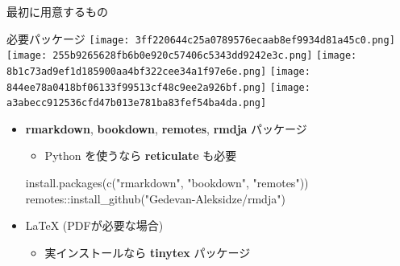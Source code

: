 \documentclass[
  ignorenonframetext,
]{beamer}
\newenvironment{Shaded}{\begin{snugshade}}{\end{snugshade}}
\newcommand{\FunctionTok}[1]{\textcolor[rgb]{0.00,0.00,0.00}{#1}}
\newcommand{\NormalTok}[1]{#1}
\newcommand{\SpecialCharTok}[1]{\textcolor[rgb]{0.00,0.00,0.00}{#1}}
\newcommand{\StringTok}[1]{\textcolor[rgb]{0.31,0.60,0.02}{#1}}
\providecommand{\tightlist}{%
  \setlength{\itemsep}{0pt}\setlength{\parskip}{0pt}}
\begin{document}
\begin{frame}{最初に用意するもの}
\protect\hypertarget{ux6700ux521dux306bux7528ux610fux3059ux308bux3082ux306e}{}
\end{frame}

\begin{frame}[fragile]{必要パッケージ}
\protect\hypertarget{ux5fc5ux8981ux30d1ux30c3ux30b1ux30fcux30b8}{}
\texttt{[image: 3ff220644c25a0789576ecaab8ef9934d81a45c0.png]}
\texttt{[image: 255b9265628fb6b0e920c57406c5343dd9242e3c.png]}
\texttt{[image: 8b1c73ad9ef1d185900aa4bf322cee34a1f97e6e.png]}
\texttt{[image: 844ee78a0418bf06133f99513cf48c9ee2a926bf.png]}
\texttt{[image: a3abecc912536cfd47b013e781ba83fef54ba4da.png]}

\begin{itemize}
\item
  \textbf{rmarkdown}, \textbf{bookdown}, \textbf{remotes}, \textbf{rmdja} パッケージ

  \begin{itemize}
  \tightlist
  \item
    Python を使うなら \textbf{reticulate} も必要
  \end{itemize}

\begin{Shaded}
\begin{Highlighting}[]
\FunctionTok{install.packages}\NormalTok{(}\FunctionTok{c}\NormalTok{(}\StringTok{"rmarkdown"}\NormalTok{, }\StringTok{"bookdown"}\NormalTok{, }\StringTok{"remotes"}\NormalTok{))}
\NormalTok{remotes}\SpecialCharTok{::}\FunctionTok{install\_github}\NormalTok{(}\StringTok{"Gedevan{-}Aleksidze/rmdja"}\NormalTok{)}
\end{Highlighting}
\end{Shaded}
\item
  LaTeX (PDFが必要な場合)

  \begin{itemize}
  \tightlist
  \item
    実インストールなら \textbf{tinytex} パッケージ
  \end{itemize}
\end{itemize}
\end{frame}
\end{document}
